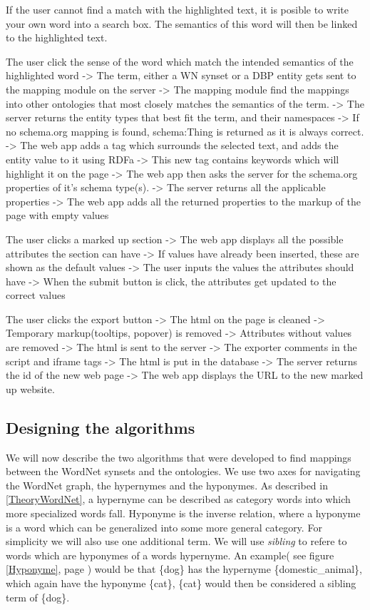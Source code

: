 	If the user cannot find a match with the highlighted text, 
	it is posible to write your own word into a search box. 
	The semantics of this word will then be linked to the highlighted text.

The user click the sense of the word which match the intended semantics of the highlighted word
	-> The term, either a WN synset or a DBP entity gets sent to the mapping module on the server
	-> The mapping module find the mappings into other ontologies 
		that most closely matches the semantics of the term.
	-> The server returns the entity types that best fit the term, and their namespaces
		-> If no schema.org mapping is found, schema:Thing is returned as it is always correct.
	-> The web app adds a tag which surrounds the selected text, and adds the entity value to it using RDFa
		-> This new tag contains keywords which will highlight it on the page
	-> The web app then asks the server for the schema.org properties of it's schema type(s).
	-> The server returns all the applicable properties
	-> The web app adds all the returned properties to the markup of the page with empty values

The user clicks a marked up section
	-> The web app displays all the possible attributes the section can have
		-> If values have already been inserted, these are shown as the default values
	-> The user inputs the values the attributes should have
	-> When the submit button is click, the attributes get updated to the correct values

The user clicks the export button
	-> The html on the page is cleaned
		-> Temporary markup(tooltips, popover) is removed
		-> Attributes without values are removed
	-> The html is sent to the server
		-> The exporter comments in the script and iframe tags
		-> The html is put in the database
	-> The server returns the id of the new web page
	-> The web app displays the URL to the new marked up website. 

\subsection{Designing the algorithms}
We will now describe the two algorithms that were developed to find mappings between the WordNet synsets and the ontologies.
We use two axes for navigating the WordNet graph, the hypernymes and the hyponymes.
As described in \ref{TheoryWordNet}, a hypernyme can be described as category words into which more specialized words fall.
Hyponyme is the inverse relation, where a hyponyme is a word which can be generalized into some more general category.
For simplicity we will also use one additional term. 
We will use \emph{sibling} to refere to words which are hyponymes of a words hypernyme. 
An example( see figure \ref{Hyponyme}, page \pageref{Hyponyme}) 
would be that \{dog\} has the hypernyme \{domestic\_animal\}, which again have the hyponyme \{cat\},
\{cat\} would then be considered a sibling term of \{dog\}.

